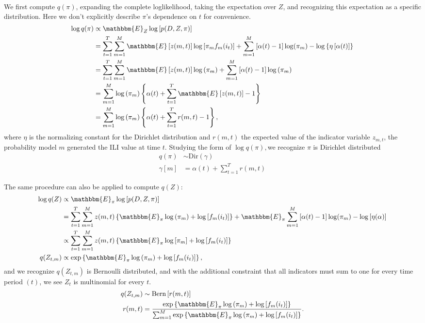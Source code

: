 \documentclass[12pt]{article}
\def\l{\left}
\def\r{\right}
\begin{document}
We first compute $q(\pi)$, expanding the complete loglikelihood, taking the expectation over $Z$, and recognizing this expectation as a specific distribution.
Here we don't explicitly describe $\pi$'s dependence on $t$ for convenience.
\begin{align*}
  \log q(\pi) &\propto \mathbbm{E}_{Z} \log \l[ p(D,Z,\pi)\r]\\
              &= \sum_{t=1}^{T} \sum_{m=1}^{M}  \mathbbm{E} \l[z(m,t)\r] \log \l[ \pi_m f_{m}(i_{t}) \r] + \sum_{m=1}^{M} \l[\alpha(t)-1\r] \log(\pi_{m}) - \log \l\{\eta\l[\alpha(t)\r]\r\}\\
              &= \sum_{t=1}^{T} \sum_{m=1}^{M}  \mathbbm{E} \l[z(m,t)\r] \log \l( \pi_m \r) + \sum_{m=1}^{M} \l[\alpha(t)-1\r] \log\l(\pi_m\r)\\
              &= \sum_{m=1}^{M} \log \l( \pi_m \r)  \l\{ \alpha(t) + \sum_{t=1}^{T}  \mathbbm{E} \l[z(m,t)\r] - 1 \r\}\\
              &= \sum_{m=1}^{M} \log \l( \pi_m \r)  \l\{ \alpha(t) + \sum_{t=1}^{T}  r(m,t) - 1 \r\},
\end{align*}
where $\eta$ is the normalizing constant for the Dirichlet distribution and $r(m,t)$ the expected value of the indicator variable $z_{m,t}$, the probability model $m$ generated the ILI value at time $t$.
Studying the form of $\log q(\pi), $we recognize $\pi$ is Dirichlet distributed
\begin{align*}
  q(\pi) &\sim \mathrm{Dir}\l( \gamma \r)\\
  \gamma\l[m\r] &= \alpha(t) + \sum_{t=1}^{T}  r(m,t)
\end{align*}

The same procedure can also be applied to compute $q(Z)$:
\begin{align}
  \log q(Z) &\propto \mathbbm{E}_{\pi} \log \l[ p(D,Z,\pi)\r] \nonumber \\
            &=  \sum_{t=1}^{T} \sum_{m=1}^{M}  z(m,t) \l\{\mathbbm{E}_{\pi} \log \l( \pi_m \r) + \log \l[ f_{m}(i_{t}) \r]\r\} +  \mathbbm{E}_{\pi}\sum_{m=1}^{M} \l[\alpha(t)-1\r] \log(\pi_{m}) - \log\l[\eta(\alpha)\r] \nonumber \\
            & \propto \sum_{t=1}^{T} \sum_{m=1}^{M}  z(m,t) \l\{ \mathbbm{E}_{\pi} \log \l[ \pi_m \r] + \log \l[ f_{m}(i_{t}) \r] \r\} \nonumber \\
  q(Z_{t,m}) &\propto  \exp \l \{ \mathbbm{E}_{\pi} \log \l( \pi_m \r) + \log \l[ f_{m}(i_{t}) \r] \r \}  \label{notNorm},
\end{align}
and we recognize $q(Z_{t,m})$ is Bernoulli distributed, and with the additional constraint that all indicators must sum to one for every time period $(t)$, we see $Z_{t}$ is multinomial for every $t$. 
\begin{align}
  q(Z_{t,m}) &\sim \mathrm{Bern}\l[ r(m,t) \r]\\
  r(m,t) &= \dfrac{ \exp \l \{ \mathbbm{E}_{\pi} \log \l( \pi_m \r) + \log \l[ f_{m}(i_{t}) \r] \r \} } {\sum_{m=1}^{M} \exp \l \{ \mathbbm{E}_{\pi} \log \l( \pi_m \r) + \log \l[ f_{m}(i_{t}) \r] \r \}}.
\end{align}
\end{document}
